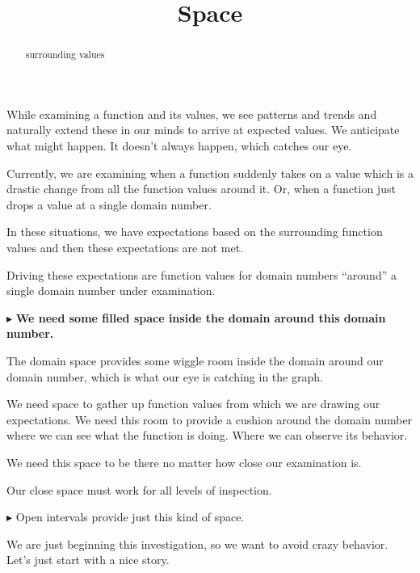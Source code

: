 \documentclass{ximera}
\title{Space}
\begin{document}
\begin{abstract}
surrounding values
\end{abstract}
\maketitle




While examining a function and its values, we see patterns and trends and naturally extend these in our minds to arrive at expected values. We anticipate what might happen.  It doesn't always happen, which catches our eye. 

Currently, we are examining when a function suddenly takes on a value which is a drastic change from all the function values around it.  Or, when a function just drops a value at a single domain number.

In these situations, we have expectations based on the surrounding function values and then these expectations are not met.

Driving these expectations are function values for domain numbers ``around'' a single domain number under examination. 


$\blacktriangleright$ \textbf{\textcolor{purple!85!blue}{We need some filled space inside the domain around this domain number.}} 

The domain space provides some wiggle room inside the domain around our domain number, which is what our eye is catching in the graph.




We need space to gather up function values from which we are drawing our expectations.  We need this room to provide a cushion around the domain number where we can see what the function is doing. Where we can observe its behavior. 


We need this space to be there no matter how close our examination is.  


Our close space must work for all levels of inspection.


\textbf{\textcolor{red!70!black}{$\blacktriangleright$}} Open intervals provide just this kind of space.





We are just beginning this investigation, so we want to avoid crazy behavior.  Let's just start with a nice story.
\end{document}
